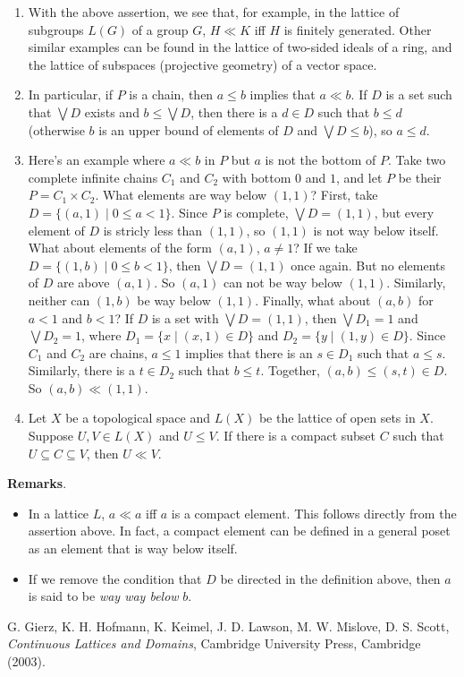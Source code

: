\documentclass[12pt]{article}
\begin{document}
\begin{enumerate}
\begin{proof}
$(\Leftarrow)$.  Let $D$ be a directed set such that $\bigvee D$ exists and $b\le \bigvee D$.  There is a finite subset $F$ of $D$ such that $a\le \bigvee F$.  Since $D$ is directed, there is an element $d\in D$ such that $d$ is the upper bound of elements of $F$.  So $a\le d$, completing the other side of the proof.
\end{proof}
\item With the above assertion, we see that, for example, in the lattice of subgroups $L(G)$ of a group $G$, $H\ll K$ iff $H$ is finitely generated.  Other similar examples can be found in the lattice of two-sided ideals of a ring, and the lattice of subspaces (projective geometry) of a vector space.
\item In particular, if $P$ is a chain, then $a\le b$ implies that $a\ll b$.  If $D$ is a set such that $\bigvee D$ exists and $b\le \bigvee D$, then there is a $d\in D$ such that $b\le d$ (otherwise $b$ is an upper bound of elements of $D$ and $\bigvee D\le b$), so $a\le d$.
\item Here's an example where $a\ll b$ in $P$ but $a$ is not the bottom of $P$.  Take two complete infinite chains $C_1$ and $C_2$ with bottom $0$ and $1$, and let $P$ be their  $P=C_1\times C_2$.  What elements are way below $(1,1)$?  First, take $D=\lbrace (a,1)\mid 0\le a<1 \rbrace$.  Since $P$ is complete, $\bigvee D=(1,1)$, but every element of $D$ is stricly less than $(1,1)$, so $(1,1)$ is not way below itself.  What about elements of the form $(a,1)$, $a\ne 1$?  If we take $D=\lbrace (1,b)\mid 0\le b<1 \rbrace$, then $\bigvee D=(1,1)$ once again.  But no elements of $D$ are above $(a,1)$.  So $(a,1)$ can not be way below $(1,1)$.  Similarly, neither can $(1,b)$ be way below $(1,1)$.  Finally, what about $(a,b)$ for $a<1$ and $b<1$?  If $D$ is a set with $\bigvee D=(1,1)$, then $\bigvee D_1=1$ and $\bigvee D_2=1$, where $D_1=\lbrace x\mid (x,1)\in D\rbrace$ and $D_2=\lbrace y\mid (1,y)\in D\rbrace$.  Since $C_1$ and $C_2$ are chains, $a\le 1$ implies that there is an $s\in D_1$ such that $a\le s$.  Similarly, there is a $t\in D_2$ such that $b\le t$.  Together, $(a,b)\le (s,t)\in D$.  So $(a,b)\ll (1,1)$.
\item Let $X$ be a topological space and $L(X)$ be the lattice of open sets in $X$.  Suppose $U,V\in L(X)$ and $U\le V$.  If there is a compact subset $C$ such that $U\subseteq C \subseteq V$, then $U\ll V$.
\end{enumerate}

\textbf{Remarks}.
\begin{itemize}
\item In a lattice $L$, $a\ll a$ iff $a$ is a compact element.  This follows directly from the assertion above.  In fact, a compact element can be defined in a general poset as an element that is way below itself.
\item If we remove the condition that $D$ be directed in the definition above, then $a$ is said to be \emph{way way below} $b$.
\end{itemize}

\begin{thebibliography}{8}
 G. Gierz, K. H. Hofmann, K. Keimel, J. D. Lawson, M. W. Mislove, D. S. Scott, {\em Continuous Lattices and Domains}, Cambridge University Press, Cambridge (2003).
\end{thebibliography}
\end{document}
